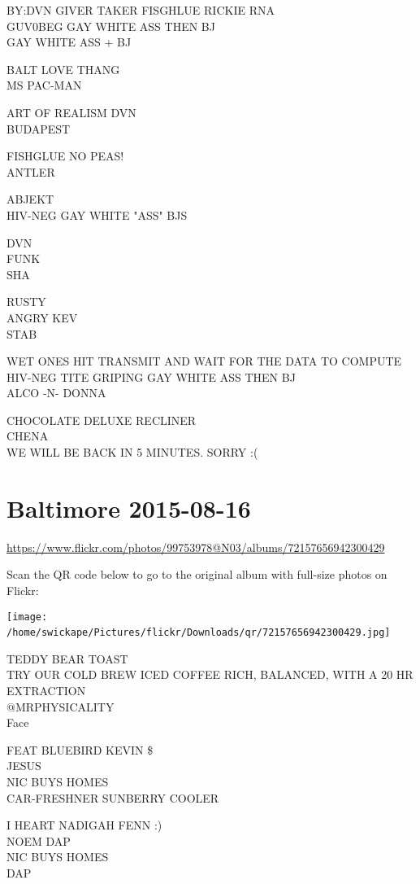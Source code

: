 \documentclass[10pt,letterpaper]{article}
\begin{document}
BY:DVN GIVER TAKER FISGHLUE RICKIE RNA\\
GUV0BEG GAY WHITE ASS THEN BJ\\
GAY WHITE ASS + BJ

BALT LOVE THANG\\
MS PAC{-}MAN

ART OF REALISM DVN\\
BUDAPEST

FISHGLUE NO PEAS!\\
ANTLER

ABJEKT\\
HIV{-}NEG GAY WHITE "ASS" BJS

DVN\\
FUNK\\
SHA

RUSTY\\
ANGRY KEV\\
STAB

WET ONES HIT TRANSMIT AND WAIT FOR THE DATA TO COMPUTE\\
HIV{-}NEG TITE GRIPING GAY WHITE ASS THEN BJ\\
ALCO {-}N{-} DONNA

CHOCOLATE DELUXE RECLINER\\
CHENA\\
WE WILL BE BACK IN 5 MINUTES.  SORRY :(
\

\section*{Baltimore 2015-08-16}

\url{https://www.flickr.com/photos/99753978@N03/albums/72157656942300429}

Scan the QR code below to go to the original album with full-size photos on Flickr:

\texttt{[image: /home/swickape/Pictures/flickr/Downloads/qr/72157656942300429.jpg]}
\

TEDDY BEAR TOAST\\
TRY OUR COLD BREW ICED COFFEE RICH, BALANCED, WITH A 20 HR EXTRACTION\\
@MRPHYSICALITY\\
Face

FEAT BLUEBIRD KEVIN \$\\
JESUS\\
NIC BUYS HOMES\\
CAR{-}FRESHNER SUNBERRY COOLER

I HEART NADIGAH FENN :)\\
NOEM DAP\\
NIC BUYS HOMES\\
DAP
\end{document}
